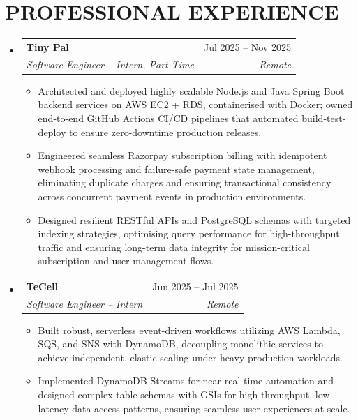 \documentclass[letterpaper,11pt]{article}
\makeatletter
\newcommand{\resumeItem}[1]{
  \item\small{
    {#1 \vspace{-2pt}}
  }
}
\newcommand{\resumeSubheading}[4]{
  \vspace{-2pt}\item
    \begin{tabular*}{0.97\textwidth}[t]{l@{\extracolsep{\fill}}r}
      \textbf{#1} & #2 \\
      \textit{\small#3} & \textit{\small #4} \\
    \end{tabular*}\vspace{-7pt}
}
\newcommand{\resumeSubHeadingListStart}{\begin{itemize}[leftmargin=0.15in, label={}]}
\newcommand{\resumeSubHeadingListEnd}{\end{itemize}}
\newcommand{\resumeItemListStart}{\begin{itemize}}
\newcommand{\resumeItemListEnd}{\end{itemize}\vspace{-5pt}}
\makeatother
\begin{document}
\section{PROFESSIONAL EXPERIENCE}
  \resumeSubHeadingListStart

    \resumeSubheading
      {Tiny Pal}{Jul 2025 -- Nov 2025}
      {Software Engineer -- Intern, Part-Time}{Remote}
      \resumeItemListStart
        \resumeItem{Architected and deployed highly scalable Node.js and Java Spring Boot backend services on AWS EC2 + RDS, containerised with Docker; owned end-to-end GitHub Actions CI/CD pipelines that automated build-test-deploy to ensure zero-downtime production releases.}
        \resumeItem{Engineered seamless Razorpay subscription billing with idempotent webhook processing and failure-safe payment state management, eliminating duplicate charges and ensuring transactional consistency across concurrent payment events in production environments.}
        \resumeItem{Designed resilient RESTful APIs and PostgreSQL schemas with targeted indexing strategies, optimising query performance for high-throughput traffic and ensuring long-term data integrity for mission-critical subscription and user management flows.}
      \resumeItemListEnd

    \resumeSubheading
      {TeCell}{Jun 2025 -- Jul 2025}
      {Software Engineer -- Intern}{Remote}
      \resumeItemListStart
        \resumeItem{Built robust, serverless event-driven workflows utilizing AWS Lambda, SQS, and SNS with DynamoDB, decoupling monolithic services to achieve independent, elastic scaling under heavy production workloads.}
        \resumeItem{Implemented DynamoDB Streams for near real-time automation and designed complex table schemas with GSIs for high-throughput, low-latency data access patterns, ensuring seamless user experiences at scale.}
      \resumeItemListEnd

  \resumeSubHeadingListEnd


\end{document}
